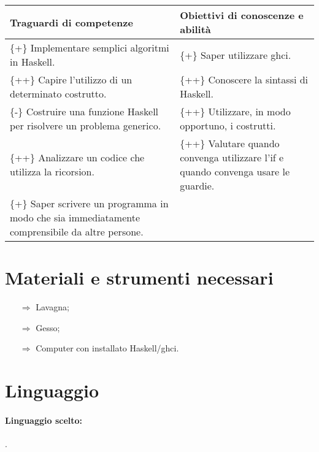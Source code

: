 \begin{center}
    \begin{tabular}{ || p{8cm} | p{8cm} ||}
    \hline\hline

    \textbf{Traguardi di competenze} & \textbf{Obiettivi di conoscenze e abilità} \\ \hline
        
        \{+\} Implementare semplici algoritmi in Haskell. & \{+\} Saper utilizzare ghci. \\\hline
        \{++\} Capire l'utilizzo di un determinato costrutto. & \{++\} Conoscere la sintassi di Haskell. \\\hline
        \{-\} Costruire una funzione Haskell per risolvere un problema generico. & \{++\} Utilizzare, in modo opportuno, i costrutti. \\\hline
        \{++\} Analizzare un codice che utilizza la ricorsion. & \{++\} Valutare quando convenga utilizzare l'if e quando convenga usare le guardie.\\\hline
        \{+\} Saper scrivere un programma in modo che sia immediatamente
        comprensibile da altre persone.& \\\hline
    \hline
    \end{tabular}
\end{center}

\section{Materiali e strumenti necessari}

\begin{itemize}
    \item [$\Rightarrow$] Lavagna;
    \item [$\Rightarrow$] Gesso;
    \item [$\Rightarrow$] Computer con installato Haskell/ghci.
\end{itemize}

\section{Linguaggio}

\paragraph{Linguaggio scelto:} .


